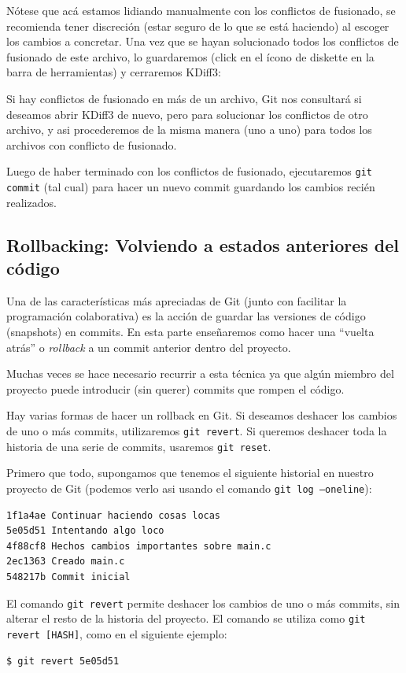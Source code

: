 \documentclass{article}
\begin{document}
Nótese que acá estamos lidiando manualmente con los conflictos de fusionado, se recomienda tener discreción (estar seguro de lo que se está haciendo) al escoger los cambios a concretar. Una vez que se hayan solucionado todos los conflictos de fusionado de este archivo, lo guardaremos (click en el ícono de diskette en la barra de herramientas) y cerraremos KDiff3:

Si hay conflictos de fusionado en más de un archivo, Git nos consultará si deseamos abrir KDiff3 de nuevo, pero para solucionar los conflictos de otro archivo, y asi procederemos de la misma manera (uno a uno) para todos los archivos con conflicto de fusionado.

Luego de haber terminado con los conflictos de fusionado, ejecutaremos \texttt{git commit} (tal cual) para hacer un nuevo commit guardando los cambios recién realizados.

\pagebreak

\subsection{Rollbacking: Volviendo a estados anteriores del código}\label{rollback}

Una de las características más apreciadas de Git (junto con facilitar la programación colaborativa) es la acción de guardar las versiones de código (snapshots) en commits. En esta parte enseñaremos como hacer una ``vuelta atrás'' o \textit{rollback} a un commit anterior dentro del proyecto.

Muchas veces se hace necesario recurrir a esta técnica ya que algún miembro del proyecto puede introducir (sin querer) commits que rompen el código.

Hay varias formas de hacer un rollback en Git. Si deseamos deshacer los cambios de uno o más commits, utilizaremos \texttt{git revert}. Si queremos deshacer toda la historia de una serie de commits, usaremos \texttt{git reset}.

Primero que todo, supongamos que tenemos el siguiente historial en nuestro proyecto de Git (podemos verlo asi usando el comando \texttt{git log --oneline}):
\begin{verbatim}
1f1a4ae Continuar haciendo cosas locas
5e05d51 Intentando algo loco
4f88cf8 Hechos cambios importantes sobre main.c
2ec1363 Creado main.c
548217b Commit inicial
\end{verbatim}

El comando \texttt{git revert} permite deshacer los cambios de uno o más commits, sin alterar el resto de la historia del proyecto. El comando se utiliza como \texttt{git revert [HASH]}, como en el siguiente ejemplo:
\begin{verbatim}
$ git revert 5e05d51
\end{verbatim}
\end{document}
